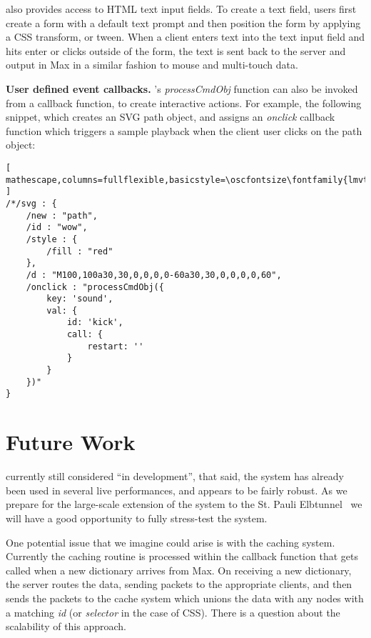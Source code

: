 \drawsocket also provides access to HTML text input fields. To create a text field, users first create a form with a default text prompt and then position the form by applying a CSS transform, or tween. When a client enters text into the text input field and hits enter or clicks outside of the form, the text is sent back to the server and output in Max in a similar fashion to mouse and multi-touch data.

\medskip
\noindent
\textbf{User defined event callbacks.}
\drawsocket's \textit{processCmdObj} function can also be invoked from a callback function, to create interactive actions. For example, the following snippet, which creates an SVG path object, and assigns an \textit{onclick} callback function which triggers a sample playback when the client user clicks on the path object:

\begin{lstlisting}[ mathescape,columns=fullflexible,basicstyle=\oscfontsize\fontfamily{lmvtt}\selectfont ]
/*/svg : {
    /new : "path",
    /id : "wow",
    /style : {
        /fill : "red"
    },
    /d : "M100,100a30,30,0,0,0,0-60a30,30,0,0,0,0,60",
    /onclick : "processCmdObj({
        key: 'sound',
        val: {
            id: 'kick',
            call: { 
                restart: '' 
            }
        }
    })"
}
\end{lstlisting}

%


\section{Future Work}

\drawsocket currently still considered ``in development'', that said, the system has already been used in several live performances, and appears to be fairly robust.
As we prepare for the large-scale extension of the system to the St. Pauli Elbtunnel~\cite{elbtunnel19} we will have a good opportunity to fully stress-test the system.

One potential issue that we imagine could arise is with the caching system. 
Currently the caching routine is processed within the callback function that gets called when a new dictionary arrives from Max.
On receiving a new dictionary, the server routes the data, sending packets to the appropriate clients, and then sends the packets to the cache system which unions the data with any nodes with a matching \textit{id} (or \textit{selector} in the case of CSS).
There is a question about the scalability of this approach. 


